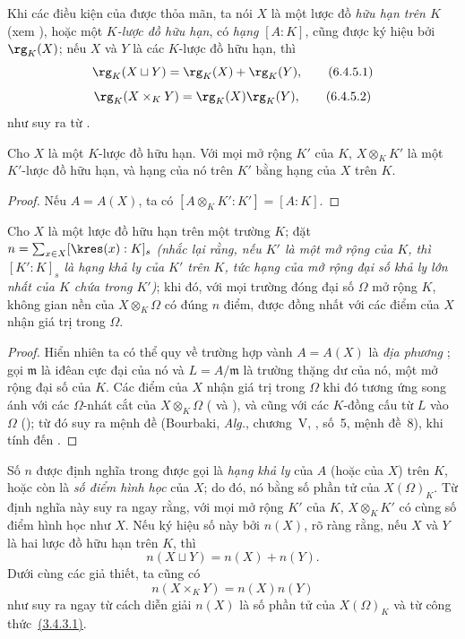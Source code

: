\documentclass[oneside]{amsart}
\newcommand{\oldpage}[2][]{{\marginnote{\normalfont\textbf{#1}~|~#2}}\ignorespaces}
\let\EGAOriginalLabel\label
\renewcommand{\label}[1]{\phantomsection\EGAOriginalLabel{#1}}
\begin{document}
\begin{env}[6.4.5]
\label{I.6.4.5}
Khi các điều kiện của  được thỏa mãn, ta nói $X$ là một lược đồ \emph{hữu hạn trên $K$} (xem ), hoặc một \emph{$K$-lược đồ hữu hạn}, có \emph{hạng} $[A:K]$, cũng được ký hiệu bởi $\rg_K(X)$;
nếu $X$ và $Y$ là các $K$-lược đồ hữu hạn, thì
\[
  \rg_K(X\sqcup Y)=\rg_K(X)+\rg_K(Y),
  \tag{6.4.5.1}
\]
\[
  \rg_K(X\times_K Y)=\rg_K(X)\rg_K(Y),
  \tag{6.4.5.2}
\]
như suy ra từ .
\end{env}

\begin{corollary}[6.4.6]
\label{I.6.4.6}
Cho $X$ là một $K$-lược đồ hữu hạn.
Với mọi mở rộng $K'$ của $K$, $X\otimes_K K'$ là một $K'$-lược đồ hữu hạn, và hạng của nó trên $K'$ bằng hạng của $X$ trên $K$.
\end{corollary}

\begin{proof}
Nếu $A=A(X)$, ta có $[A\otimes_K K':K']=[A:K]$.
\end{proof}

\begin{corollary}[6.4.7]
\label{I.6.4.7}
Cho $X$ là một lược đồ hữu hạn trên một trường $K$;
đặt $n=\sum_{x\in X}[\kres(x):K]_s$ \emph{(nhắc lại rằng, nếu $K'$ là một mở rộng của $K$, thì $[K':K]_s$ là \emph{hạng khả ly} của $K'$ trên $K$, tức hạng của mở rộng đại số khả ly lớn nhất của $K$ chứa trong $K'$)};
\oldpage[I]{149}
khi đó,
với mọi trường đóng đại số $\Omega$ mở rộng $K$, không gian nền của $X\otimes_K\Omega$ có đúng $n$ điểm, được đồng nhất với các điểm của $X$ nhận giá trị trong $\Omega$.
\end{corollary}

\begin{proof}
Hiển nhiên ta có thể quy về trường hợp vành $A=A(X)$ là \emph{địa phương} ;
gọi $\mathfrak{m}$ là iđêan cực đại của nó và $L=A/\mathfrak{m}$ là trường thặng dư của nó, một mở rộng đại số của $K$.
Các điểm của $X$ nhận giá trị trong $\Omega$ khi đó tương ứng song ánh với các $\Omega$-nhát cắt của $X\otimes_K\Omega$ ( và ), và cũng với các $K$-đồng cấu từ $L$ vào $\Omega$ (); từ đó suy ra mệnh đề (Bourbaki, \emph{Alg.}, chương~V, , số~5, mệnh đề~8), khi tính đến .
\end{proof}

\begin{env}[6.4.8]
\label{I.6.4.8}
Số $n$ được định nghĩa trong  được gọi là \emph{hạng khả ly} của $A$ (hoặc của $X$) trên $K$, hoặc còn là \emph{số điểm hình học} của $X$;
do đó, nó bằng số phần tử của $X(\Omega)_K$.
Từ định nghĩa này suy ra ngay rằng, với mọi mở rộng $K'$ của $K$, $X\otimes_K K'$ có cùng số điểm hình học như $X$.
Nếu ký hiệu số này bởi $n(X)$, rõ ràng rằng, nếu $X$ và $Y$ là hai lược đồ hữu hạn trên $K$, thì
\[
  n(X\sqcup Y)=n(X)+n(Y).
  \tag{6.4.8.1}
\]
Dưới cùng các giả thiết, ta cũng có
\[
  n(X\times_K Y)=n(X)n(Y)
  \tag{6.4.8.2}
\]
như suy ra ngay từ cách diễn giải $n(X)$ là số phần tử của $X(\Omega)_K$ và từ công thức~\hyperref[I.3.4.3.1]{(3.4.3.1)}.
\end{env}
\end{document}
